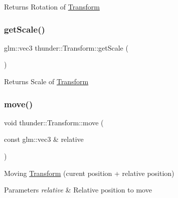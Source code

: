 \begin{DoxyReturn}{Returns}
Rotation of \mbox{\hyperlink{classthunder_1_1_transform}{Transform}} 
\end{DoxyReturn}
\mbox{\label{classthunder_1_1_transform_af70a68891b7b9158f2a1c4f02ad057b0}} 
\subsubsection{\texorpdfstring{get\+Scale()}{getScale()}}
{\footnotesize\ttfamily glm\+::vec3 thunder\+::\+Transform\+::get\+Scale (\begin{DoxyParamCaption}{ }\end{DoxyParamCaption})\hspace{0.3cm}{\ttfamily [inline]}}

\begin{DoxyReturn}{Returns}
Scale of \mbox{\hyperlink{classthunder_1_1_transform}{Transform}} 
\end{DoxyReturn}
\mbox{\label{classthunder_1_1_transform_a02c705563b8f94336f79bd3cd5cbea76}} 
\subsubsection{\texorpdfstring{move()}{move()}}
{\footnotesize\ttfamily void thunder\+::\+Transform\+::move (\begin{DoxyParamCaption}\item[{const glm\+::vec3 \&}]{relative }\end{DoxyParamCaption})}

Moving \mbox{\hyperlink{classthunder_1_1_transform}{Transform}} (curent position + relative position)


\begin{DoxyParams}{Parameters}
{\em relative} & Relative position to move \\
\hline
\end{DoxyParams}
\mbox{\label{classthunder_1_1_transform_ae178b3c22200182a7694b83ec34a65f5}} 
